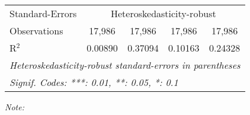 \begin{table}[htbp!]
\begin{adjustbox}{width = 1\textwidth, max height = 0.95\textheight, center}
\begin{threeparttable}[b]
\begin{tabular}{lcccc}
            \midrule 
            Standard-Errors & \multicolumn{4}{c}{Heteroskedasticity-robust} \\ 
            Observations         & 17,986                         & 17,986                         & 17,986                         & 17,986\\  
            R$^2$                & 0.00890                        & 0.37094                        & 0.10163                        & 0.24328\\  
            \midrule \midrule
            \multicolumn{5}{l}{\emph{Heteroskedasticity-robust standard-errors in parentheses}}\\
            \multicolumn{5}{l}{\emph{Signif. Codes: ***: 0.01, **: 0.05, *: 0.1}}\\
         \end{tabular}
         
         \begin{tablenotes}\item \medskip \textit{Note:}
         \end{tablenotes}
      \end{threeparttable}
   \end{adjustbox}
\end{table}


